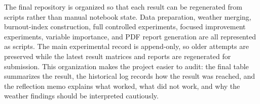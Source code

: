 \documentclass[10pt]{article}
\begin{document}
The final repository is organized so that each result can be regenerated from scripts rather than manual notebook state. Data preparation, weather merging, burnout-index construction, full controlled experiments, focused improvement experiments, variable importance, and PDF report generation are all represented as scripts. The main experimental record is append-only, so older attempts are preserved while the latest result matrices and reports are regenerated for submission. This organization makes the project easier to audit: the final table summarizes the result, the historical log records how the result was reached, and the reflection memo explains what worked, what did not work, and why the weather findings should be interpreted cautiously.
\end{document}
